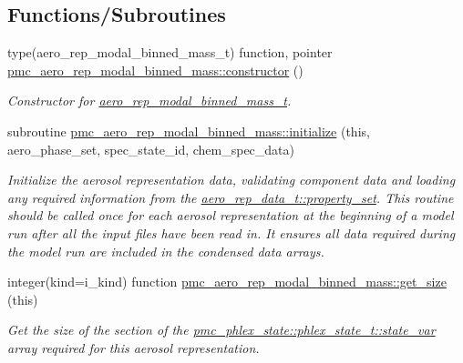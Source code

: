 \subsection*{Functions/\+Subroutines}
\begin{DoxyCompactItemize}
\item 
type(aero\+\_\+rep\+\_\+modal\+\_\+binned\+\_\+mass\+\_\+t) function, pointer \mbox{\hyperlink{namespacepmc__aero__rep__modal__binned__mass_a45a135fa387108e2a7ac3664186f3a09}{pmc\+\_\+aero\+\_\+rep\+\_\+modal\+\_\+binned\+\_\+mass\+::constructor}} ()
\begin{DoxyCompactList}\small\item\em Constructor for \mbox{\hyperlink{structpmc__aero__rep__modal__binned__mass_1_1aero__rep__modal__binned__mass__t}{aero\+\_\+rep\+\_\+modal\+\_\+binned\+\_\+mass\+\_\+t}}. \end{DoxyCompactList}\item 
subroutine \mbox{\hyperlink{namespacepmc__aero__rep__modal__binned__mass_ab5b93faae1796c83780773a5475adeed}{pmc\+\_\+aero\+\_\+rep\+\_\+modal\+\_\+binned\+\_\+mass\+::initialize}} (this, aero\+\_\+phase\+\_\+set, spec\+\_\+state\+\_\+id, chem\+\_\+spec\+\_\+data)
\begin{DoxyCompactList}\small\item\em Initialize the aerosol representation data, validating component data and loading any required information from the {\ttfamily \mbox{\hyperlink{structpmc__aero__rep__data_1_1aero__rep__data__t_a87b1bf5cd10a0a2b51390fb24ebf56c5}{aero\+\_\+rep\+\_\+data\+\_\+t\+::property\+\_\+set}}}. This routine should be called once for each aerosol representation at the beginning of a model run after all the input files have been read in. It ensures all data required during the model run are included in the condensed data arrays. \end{DoxyCompactList}\item 
integer(kind=i\+\_\+kind) function \mbox{\hyperlink{namespacepmc__aero__rep__modal__binned__mass_a2d6f17a8b9f3c6748a16f97d034bc9d1}{pmc\+\_\+aero\+\_\+rep\+\_\+modal\+\_\+binned\+\_\+mass\+::get\+\_\+size}} (this)
\begin{DoxyCompactList}\small\item\em Get the size of the section of the {\ttfamily \mbox{\hyperlink{structpmc__phlex__state_1_1phlex__state__t_a78835cb552d483ebbfc7a6bc6f756918}{pmc\+\_\+phlex\+\_\+state\+::phlex\+\_\+state\+\_\+t\+::state\+\_\+var}}} array required for this aerosol representation. \end{DoxyCompactList}\item 

\end{DoxyCompactItemize}

